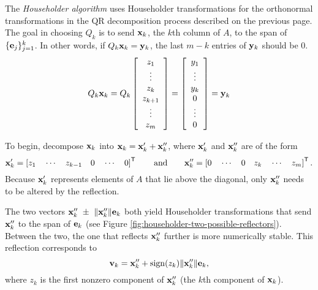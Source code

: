 The \emph{Householder algorithm} uses Householder transformations for the orthonormal transformations in the QR decomposition process described on the previous page.
The goal in choosing $Q_k$ is to send $\mathbf{x}_k$, the $k$th column of $A$, to the span of $\{\mathbf{e}_j\}_{j=1}^k$.
In other words, if $Q_k\mathbf{x}_k = \mathbf{y}_k$, the last $m - k$ entries of $\mathbf{y}_k$ should be $0$.
%
\begin{align*}
Q_k\mathbf{x}_k = Q_k
\left[\begin{array}{c}
z_1 \\ \vdots \\ z_k \\ z_{k+1} \\ \vdots \\ z_m
\end{array}\right]
=
\left[\begin{array}{c}
y_1 \\ \vdots \\ y_k \\ 0 \\ \vdots \\ 0
\end{array}\right]
= \mathbf{y}_k
\end{align*}

To begin, decompose $\mathbf{x}_k$ into $\mathbf{x}_k = \mathbf{x}_k' + \mathbf{x}_k''$, where $\mathbf{x}_k'$ and $\mathbf{x}_k''$ are of the form
\[
\mathbf{x}_k' = \left[z_1\quad \cdots\quad z_{k-1}\quad 0\quad \cdots\quad 0\right]^{\mathsf T}
\qquad\text{and}\qquad
\mathbf{x}_k'' = \left[0\quad \cdots\quad 0\quad z_k\quad \cdots\quad z_m\right]^{\mathsf T}.
\]
Because $\mathbf{x}_k'$ represents elements of $A$ that lie above the diagonal, only $\mathbf{x}_k''$ needs to be altered by the reflection.

The two vectors $\x_k''\ \pm\ \|\x_k''\|\e_k$ both yield Householder transformations that send $\mathbf{x}_k''$ to the span of $\mathbf{e}_k$ (see Figure \ref{fig:householder-two-possible-reflectors}).
Between the two, the one that reflects $\mathbf{x}_k''$ further is more numerically stable.
This reflection corresponds to \[\mathbf{v}_k = \mathbf{x}_k'' + \operatorname{sign}(z_k)\|\mathbf{x}_k''\| \mathbf{e}_k,\] where $z_k$ is the first nonzero component of $\mathbf{x}_k''$ (the $k$th component of $\mathbf{x}_k$).

